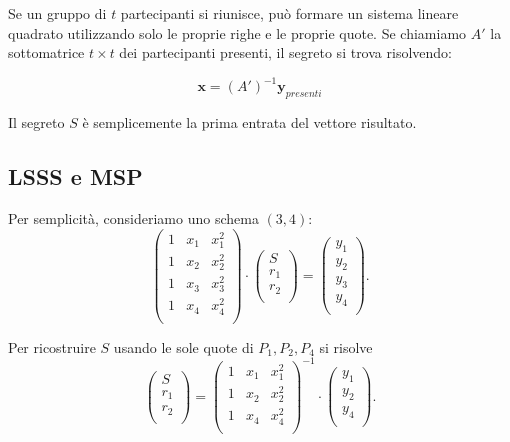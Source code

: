 \documentclass[a4paper, 11pt]{article}
\begin{document}
Se un gruppo di $t$ partecipanti si riunisce, può formare un sistema lineare quadrato utilizzando solo le proprie righe e le proprie quote. Se chiamiamo $A'$ la sottomatrice $t \times t$ dei partecipanti presenti, il segreto si trova risolvendo:

\[
    \mathbf{x} = (A')^{-1}\mathbf{y}_{presenti}
\]

Il segreto $S$ è semplicemente la prima entrata del vettore risultato.

\subsection{LSSS e MSP}

Per semplicità, consideriamo uno schema $(3,4)$:
\[
\begin{pmatrix}
1 & x_1 & x_1^2 \\
1 & x_2 & x_2^2 \\
1 & x_3 & x_3^2 \\
1 & x_4 & x_4^2 \\
\end{pmatrix}
\cdot
\begin{pmatrix}
S \\
r_1 \\
r_2 \\
\end{pmatrix}
=
\begin{pmatrix}
y_1 \\
y_2 \\
y_3 \\
y_4 \\
\end{pmatrix}.
\]

Per ricostruire $S$ usando le sole quote di $P_1,P_2,P_4$ si risolve
\[
\begin{pmatrix}
S \\
r_1 \\
r_2 \\
\end{pmatrix}
=
\begin{pmatrix}
1 & x_1 & x_1^2 \\
1 & x_2 & x_2^2 \\
1 & x_4 & x_4^2 \\
\end{pmatrix}^{-1}
\cdot
\begin{pmatrix}
y_1 \\
y_2 \\
y_4 \\
\end{pmatrix}.
\]
\end{document}
